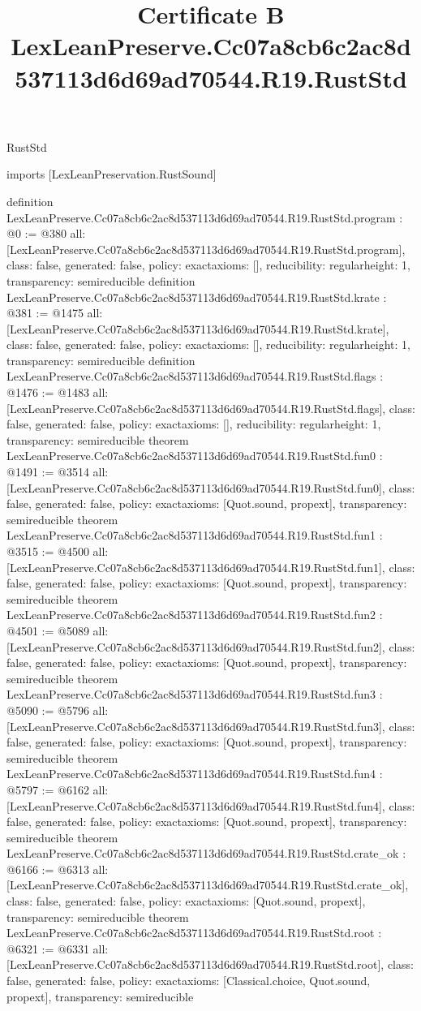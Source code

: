 \begin{lexlean}{RustStd}
\title{Certificate B LexLeanPreserve.Cc07a8cb6c2ac8d537113d6d69ad70544.R19.RustStd}
\begin{coremodule}
imports [LexLeanPreservation.RustSound]

definition LexLeanPreserve.Cc07a8cb6c2ac8d537113d6d69ad70544.R19.RustStd.program : @0 := @380 {
  all: [LexLeanPreserve.Cc07a8cb6c2ac8d537113d6d69ad70544.R19.RustStd.program],
  class: false,
  generated: false,
  policy: exact{axioms: []},
  reducibility: regular{height: 1},
  transparency: semireducible
}
definition LexLeanPreserve.Cc07a8cb6c2ac8d537113d6d69ad70544.R19.RustStd.krate : @381 := @1475 {
  all: [LexLeanPreserve.Cc07a8cb6c2ac8d537113d6d69ad70544.R19.RustStd.krate],
  class: false,
  generated: false,
  policy: exact{axioms: []},
  reducibility: regular{height: 1},
  transparency: semireducible
}
definition LexLeanPreserve.Cc07a8cb6c2ac8d537113d6d69ad70544.R19.RustStd.flags : @1476 := @1483 {
  all: [LexLeanPreserve.Cc07a8cb6c2ac8d537113d6d69ad70544.R19.RustStd.flags],
  class: false,
  generated: false,
  policy: exact{axioms: []},
  reducibility: regular{height: 1},
  transparency: semireducible
}
theorem LexLeanPreserve.Cc07a8cb6c2ac8d537113d6d69ad70544.R19.RustStd.fun0 : @1491 := @3514 {
  all: [LexLeanPreserve.Cc07a8cb6c2ac8d537113d6d69ad70544.R19.RustStd.fun0],
  class: false,
  generated: false,
  policy: exact{axioms: [Quot.sound, propext]},
  transparency: semireducible
}
theorem LexLeanPreserve.Cc07a8cb6c2ac8d537113d6d69ad70544.R19.RustStd.fun1 : @3515 := @4500 {
  all: [LexLeanPreserve.Cc07a8cb6c2ac8d537113d6d69ad70544.R19.RustStd.fun1],
  class: false,
  generated: false,
  policy: exact{axioms: [Quot.sound, propext]},
  transparency: semireducible
}
theorem LexLeanPreserve.Cc07a8cb6c2ac8d537113d6d69ad70544.R19.RustStd.fun2 : @4501 := @5089 {
  all: [LexLeanPreserve.Cc07a8cb6c2ac8d537113d6d69ad70544.R19.RustStd.fun2],
  class: false,
  generated: false,
  policy: exact{axioms: [Quot.sound, propext]},
  transparency: semireducible
}
theorem LexLeanPreserve.Cc07a8cb6c2ac8d537113d6d69ad70544.R19.RustStd.fun3 : @5090 := @5796 {
  all: [LexLeanPreserve.Cc07a8cb6c2ac8d537113d6d69ad70544.R19.RustStd.fun3],
  class: false,
  generated: false,
  policy: exact{axioms: [Quot.sound, propext]},
  transparency: semireducible
}
theorem LexLeanPreserve.Cc07a8cb6c2ac8d537113d6d69ad70544.R19.RustStd.fun4 : @5797 := @6162 {
  all: [LexLeanPreserve.Cc07a8cb6c2ac8d537113d6d69ad70544.R19.RustStd.fun4],
  class: false,
  generated: false,
  policy: exact{axioms: [Quot.sound, propext]},
  transparency: semireducible
}
theorem LexLeanPreserve.Cc07a8cb6c2ac8d537113d6d69ad70544.R19.RustStd.crate_ok : @6166 := @6313 {
  all: [LexLeanPreserve.Cc07a8cb6c2ac8d537113d6d69ad70544.R19.RustStd.crate_ok],
  class: false,
  generated: false,
  policy: exact{axioms: [Quot.sound, propext]},
  transparency: semireducible
}
theorem LexLeanPreserve.Cc07a8cb6c2ac8d537113d6d69ad70544.R19.RustStd.root : @6321 := @6331 {
  all: [LexLeanPreserve.Cc07a8cb6c2ac8d537113d6d69ad70544.R19.RustStd.root],
  class: false,
  generated: false,
  policy: exact{axioms: [Classical.choice, Quot.sound, propext]},
  transparency: semireducible
}


\end{coremodule}
\end{lexlean}
